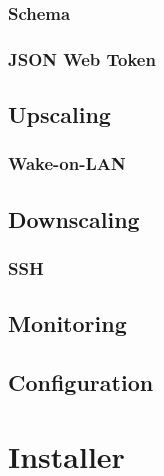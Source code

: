 \subsubsection{Schema}
\label{subsubsec:implementation_server_graphql_schema}

\subsubsection{JSON Web Token}
\label{subsubsec:implementation_server_graphql_json_web_token}

\subsection{Upscaling}
\label{subsec:implementation_server_upscaling}

\subsubsection{Wake-on-LAN}
\label{subsubsec:implementation_server_scale_up_wake_on_lan}

\subsection{Downscaling}
\label{subsec:implementation_server_downscaling}

\subsubsection{SSH}
\label{subsubsec:implementation_server_scale_up_ssh}

\subsection{Monitoring}
\label{subsec:implementation_server_monitoring}

\subsection{Configuration}
\label{subsec:implementation_server_configuration}


\section{Installer}
\label{sec:implementation_installer}


